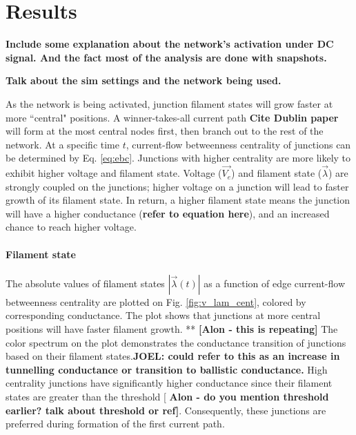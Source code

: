 \documentclass[fleqn,10pt,  amsmath,amssymb,aps]{wlscirep}
\begin{document}
\clearpage
\section*{Results}

\textbf{Include some explanation about the network's activation under DC signal. And the fact most of the analysis are done with snapshots.}

\textbf{Talk about the sim settings and the network being used.}

As the network is being activated, junction filament states will grow faster at more ``central" positions. A winner-takes-all current path \textbf{Cite Dublin paper} will form at the most central nodes first, then branch out to the rest of the network. At a specific time $t$, current-flow betweenness centrality of junctions can be determined by Eq. \ref{eq:ebc}. Junctions with higher centrality are more likely to exhibit higher voltage and filament state. Voltage ($\vec{V_e}$) and filament state ($\vec{\lambda}$) are strongly coupled on the junctions; higher voltage on a junction will lead to faster growth of its filament state. In return, a higher filament state means the junction will have a higher conductance (\textbf{refer to equation here}), and an increased chance to reach higher voltage.


\paragraph{Filament state}

The absolute values of filament states $|\vec{\lambda}(t)|$ as a function of edge current-flow betweenness centrality are plotted on Fig. \ref{fig:v_lam_cent}, colored by corresponding conductance. The plot shows that junctions at more central positions will have faster filament growth. **  \textbf{[Alon - this is repeating]} The color spectrum on the plot demonstrates the conductance transition of junctions based on their filament states.\textbf{JOEL: could refer to this as an increase in tunnelling conductance or transition to ballistic conductance.} High centrality junctions have significantly higher conductance since their filament states are greater than the threshold [ \textbf{Alon - do you mention threshold earlier? talk about threshold or ref]}. Consequently, these junctions are preferred during formation of the first current path.
\end{document}
